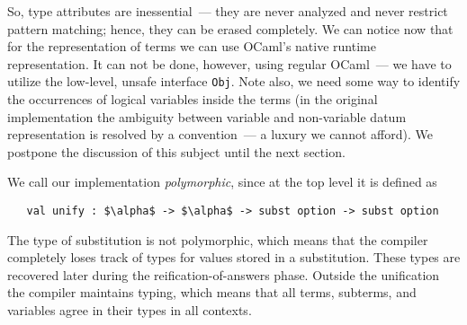 So, type attributes are inessential~--- they are never analyzed and never restrict pattern matching; hence,
they can be erased completely. 
We can notice now that for the representation of terms we can use OCaml's native runtime representation. 
It can not be done, however, using regular OCaml~--- we have to utilize the low-level, unsafe interface \lstinline{Obj}. 
Note also, we need some way to identify the occurrences of logical variables inside the terms (in the original \miniKanren
implementation the ambiguity between variable and non-variable datum representation is resolved by a convention~--- a luxury 
we cannot afford).  We postpone the discussion of this subject until the next section.



We call our implementation \emph{polymorphic}, since at the top level it is defined as

\begin{lstlisting}
   val unify : $\alpha$ -> $\alpha$ -> subst option -> subst option
\end{lstlisting}

The type of substitution is not polymorphic, which means that the compiler completely loses track
of types for values stored in a substitution. These types are recovered later during the reification-of-answers phase.
Outside the unification the compiler maintains typing, which means that all terms, subterms, and variables agree in their types
in all contexts.
